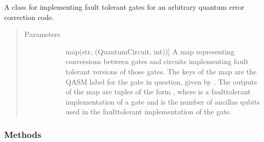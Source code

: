 \documentclass[letterpaper,10pt,english]{sphinxmanual}
\begin{document}
\begin{fulllineitems}
\begin{fulllineitems}
\begin{quote}
\begin{description}
\begin{description}
\end{description}

\end{description}\end{quote}

\end{fulllineitems}


\end{fulllineitems}


\begin{fulllineitems}
\label{\detokenize{Base:BaseFaultTolerance.FaultTolerantGates}}
A class for implementing fault tolerant gates for an arbitrary quantum error correction code.
\begin{quote}\begin{description}
\item[{Parameters}] \leavevmode\begin{description}
\item[{}] \leavevmode{[}map(str, (QuantumCircuit, int)){]}
A map representing conversions between gates and circuits implementing fault tolerant versions of those gates. 
The keys of the map are the QASM label for the gate in question, given by .
The outputs of the map are tuples of the form , where  is a fault\sphinxhyphen{}tolerant implementation of a gate and  is the number of ancillas qubits used in the fault\sphinxhyphen{}tolerant implementation of the gate.

\end{description}

\end{description}\end{quote}
\subsubsection*{Methods}


\begin{savenotes}\sphinxattablestart
\centering
\begin{tabulary}{\linewidth}[t]{|T|T|}
\hline


\end{tabulary}
\end{savenotes}
\end{fulllineitems}
\end{document}
